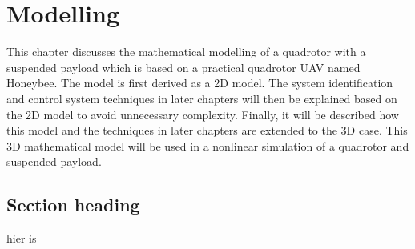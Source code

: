 \graphicspath{{modelling/fig/}}

\chapter{Modelling}
\label{chap:modelling}

This chapter discusses the mathematical modelling of a quadrotor with a suspended
payload which is based on a practical quadrotor UAV named Honeybee.
The model is first derived as a 2D model.
The system identification and control system techniques in later chapters will then be explained based on the 2D model to avoid unnecessary complexity.
Finally, it will be described how this model and the techniques in later chapters are extended to the 3D case.
This 3D mathematical model will be used in a nonlinear simulation of a quadrotor and suspended payload.

\section{Section heading}

hier is
